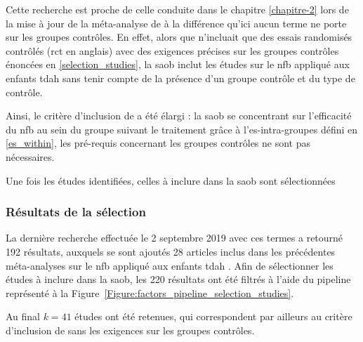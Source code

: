 Cette recherche est proche de celle conduite dans le chapitre \ref{chapitre-2} lors de la mise à jour de la méta-analyse de \citet{Cortese2016} à la différence
qu'ici aucun terme ne porte sur les groupes contrôles. En effet, alors que \citet{Cortese2016} n'incluait que des essais randomisés contrôlés (\gls{rct} en anglais) 
avec des exigences précises sur les groupes contrôles énoncées en \ref{selection_studies}, la \gls{saob} inclut les études sur le \gls{nfb} appliqué aux enfants 
\gls{tdah} sans tenir compte de la présence d'un groupe contrôle et du type de contrôle. 

Ainsi, le critère d'inclusion de \citet{Cortese2016} a été élargi : la \gls{saob} se concentrant sur l'efficacité du \gls{nfb} au sein du 
groupe suivant le traitement grâce à l'\gls{es}-intra-groupes défini en \ref{es_within}, les pré-requis concernant les groupes contrôles 
ne sont pas nécessaires.

Une fois les études identifiées, celles à inclure dans la \gls{saob} sont sélectionnées

\subsubsection{Résultats de la sélection}

La dernière recherche effectuée le 2 septembre 2019 avec ces termes a retourné 192 résultats, auxquels se sont ajoutés 28 articles inclus dans les précédentes 
méta-analyses sur le \gls{nfb} appliqué aux enfants \gls{tdah} \citep{Arns2009, Sonuga-Barke2013, Micoulaud2014, 
Cortese2016, Catala2017, VanDoren2019, Riesco2019, Bussalb2019clinical}. 
Afin de sélectionner les études à inclure dans la \gls{saob}, les 220 résultats ont été filtrés à l'aide du pipeline représenté à la 
Figure~\ref{Figure:factors_pipeline_selection_studies}. 

Au final $k = 41$ études ont été retenues, qui correspondent par ailleurs au critère d'inclusion de
\citet{Cortese2016} sans les exigences sur les groupes contrôles. 

